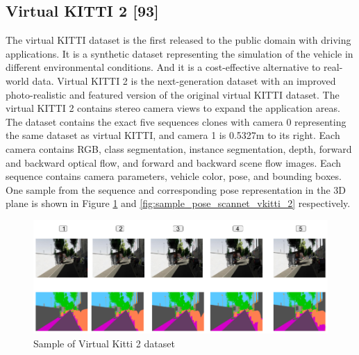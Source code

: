     \subsection{Virtual KITTI 2 [93]}
    
	The virtual KITTI dataset is the first released to the public domain with driving applications. It is a synthetic dataset representing the simulation of the vehicle in different environmental conditions. And it is a cost-effective alternative to real-world data. Virtual KITTI 2 is the next-generation dataset with an improved photo-realistic and featured version of the original virtual KITTI dataset. The virtual KITTI 2 contains stereo camera views to expand the application areas. The dataset contains the exact five sequences clones with camera 0 representing the same dataset as virtual KITTI, and camera 1 is 0.5327m to its right. Each camera contains RGB, class segmentation, instance segmentation, depth, forward and backward optical flow, and forward and backward scene flow images. Each sequence contains camera parameters, vehicle color, pose, and bounding boxes. One sample from the sequence and corresponding pose representation in the 3D plane is shown in Figure \ref{fig:sample_scannet_vkitti_2} and \ref{fig:sample_pose_scannet_vkitti_2} respectively.
	 
	\begin{figure}[h]
		\centering
		\includegraphics[width=14cm]{images/images_segm_vkitti.png}
		\caption{Sample of Virtual Kitti 2 dataset}
		\label{fig:sample_scannet_vkitti_2}
	\end{figure}

